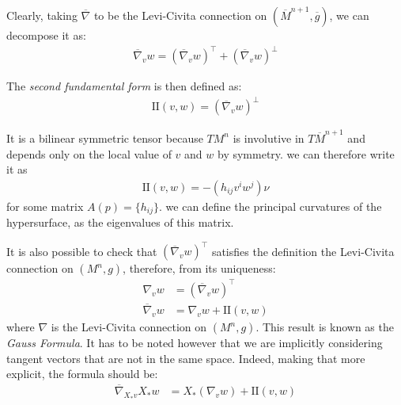 Clearly, taking $\overline{\nabla}$ to be the Levi-Civita connection on $(\overline{M}^{n+1}, \overline{g})$, we can decompose it as:
\begin{align*}
	\overline{\nabla}_v w = (\overline{\nabla}_v w )^\top +  (\overline{\nabla}_v w )^\bot
\end{align*} 

\begin{defin}
	The {\em second fundamental form} is then defined as: 
	\begin{align*}
	 	\mathrm{I\!I} (v, w) =  (\overline{\nabla}_v w )^\bot 	
	\end{align*} 
\end{defin}
It is a bilinear symmetric tensor because $TM^n$ is involutive in $T\overline{M}^{n+1}$ and depends only on the local value of $v$ and $w$ by symmetry. we can therefore write it as
\begin{align*}
	\mathrm{I\!I} (v, w) = -(h_{ij}v^iw^j)\nu
\end{align*} 
for some matrix $A(p)=\{h_{ij}\}$. we can define the principal curvatures of the hypersurface, as the eigenvalues of this matrix.

It is also possible to check that $(\overline{\nabla}_v w )^\top$ satisfies the definition the Levi-Civita connection on $(M^n, g)$, therefore, from its uniqueness:
\begin{align*}
	\nabla_v w &=  (\overline{\nabla}_v w )^\top	\\
	\overline{\nabla}_v w &= \nabla_v w  + \mathrm{I\!I} (v, w) 
\end{align*} 
where $\nabla$ is the Levi-Civita connection on $(M^n, g)$. This result is known as the {\em Gauss Formula}. It has to be noted however that we are implicitly considering tangent vectors that are not in the same space. Indeed, making that more explicit, the formula should be:
\begin{align*}
	\overline{\nabla}_{X_*v} X_* w &= X_* (\nabla_v w)  + \mathrm{I\!I} (v, w) 
\end{align*}

